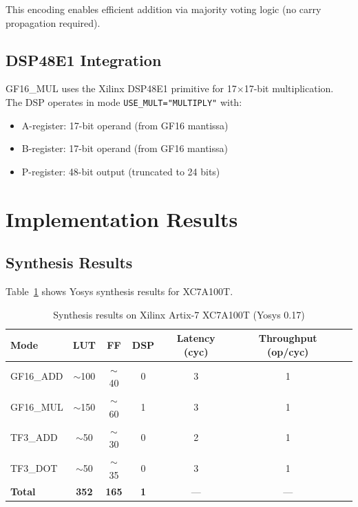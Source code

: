 \documentclass[10pt,conference]{IEEEtran}
\begin{document}
This encoding enables efficient addition via majority voting logic (no carry propagation required).

\subsection{DSP48E1 Integration}

GF16\_MUL uses the Xilinx DSP48E1 primitive for 17$\times$17-bit multiplication. The DSP operates in mode \texttt{USE\_MULT="MULTIPLY"} with:
\begin{itemize}
  \item A-register: 17-bit operand (from GF16 mantissa)
  \item B-register: 17-bit operand (from GF16 mantissa)
  \item P-register: 48-bit output (truncated to 24 bits)
\end{itemize}


\section{Implementation Results}

\subsection{Synthesis Results}

Table~\ref{tab:synthesis} shows Yosys synthesis results for XC7A100T.

\begin{table}[t]
  \centering
  \caption{Synthesis results on Xilinx Artix-7 XC7A100T (Yosys 0.17)}
  \label{tab:synthesis}
  \begin{tabular}{lcccccc}
    \toprule
    Mode & LUT & FF & DSP & Latency (cyc) & Throughput (op/cyc) \\
    \midrule
    GF16\_ADD & $\sim$100 & $\sim$40 & 0 & 3 & 1 \\
    GF16\_MUL & $\sim$150 & $\sim$60 & 1 & 3 & 1 \\
    TF3\_ADD & $\sim$50 & $\sim$30 & 0 & 2 & 1 \\
    TF3\_DOT & $\sim$50 & $\sim$35 & 0 & 3 & 1 \\
    \midrule
    \textbf{Total} & \textbf{352} & \textbf{165} & \textbf{1} & — & — \\
    \bottomrule
  \end{tabular}
\end{table}
\end{document}
